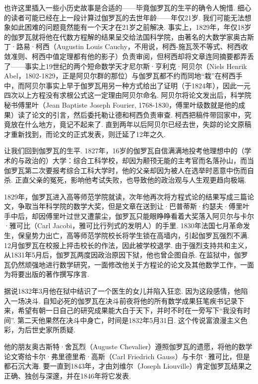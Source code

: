 也许这里插入一些小历史故事是合适的——毕竟伽罗瓦的生平的确令人惋惜. 细心的读者可能已经在上一段计算过伽罗瓦的去世年龄——年仅21岁. 我们可能无法想象如此困难的问题竟然能有一个天才在21岁之前解决. 事实上，1829年，年仅18岁的伽罗瓦就将他在代数方程解的结果呈交给法国科学院，由著名的大数学家奥古斯丁·路易·柯西（Augustin Louis Cauchy，不用说，柯西-施瓦茨不等式、柯西收敛准则、柯西中值定理都有他的影子）负责审阅，但柯西却将文章连同摘要都弄丢了——事实上19世纪的两个短命数学天才尼尔斯·亨利克·阿贝尔（Niels Henrik Abel，1802-1829，正是阿贝尔群的那位）与伽罗瓦都不约而同地``栽''在柯西手中，而阿贝尔事实上早于伽罗瓦用另一种方式给出了证明（于1824年），因此一元四次以上方程没有求根公式这一定理由阿贝尔命名. 阿贝尔将论文发出后，科学院秘书傅里叶（Jean Baptiste Joseph Fourier, 1768-1830，傅里叶级数就是他的成果）读了论文的引言，然后委托勒让德和柯西负责审查. 柯西把稿件带回家中，究竟放在什么地方，竟记不起来了. 直到两年以后阿贝尔已经去世，失踪的论文原稿才重新找到，而论文的正式发表，则迁延了12年之久.

让我们回到伽罗瓦的生平. 1827年，16岁的伽罗瓦自信满满地投考他理想中的（学术的与政治的）大学：综合工科学校，却因为颟顸无能的主考官而名落孙山，而当伽罗瓦第二次要报考综合工科大学时，他的父亲却因为被人在选举时恶意中伤而自杀. 正直父亲的冤死，影响他考试失败，也导致他的政治观与人生观更趋向极端.

1829年，伽罗瓦进入高等师范学院就读，次年他再次将方程式论的结果写成三篇论文，争取当年科学院的数学大奖，但是文章在送到让·巴普蒂斯·约瑟夫·傅里叶手中后，却因傅里叶过世又遭蒙尘，伽罗瓦只能眼睁睁看着大奖落入阿贝尔与卡尔·雅可比（Carl Jacobi，雅可比行列式的发明人）的手里. 1830年法国七月革命发生，保皇势力出亡，高等师范学院校长将学生锁在高墙内，引起伽罗瓦强烈不满. 12月伽罗瓦在校报上抨击校长的作法，因此被学校退学. 由于强烈支持共和主义，从1831年5月后，伽罗瓦两度因政治原因下狱，他也曾企图自杀. 在监狱中，伽罗瓦仍然顽强地进行数学研究，一面修改他关于方程论的论文及其他数学工作，一面为将要出版的著作撰写序言.

据说1832年3月他在狱中结识了一个医生的女儿并陷入狂恋. 因为这段感情，他陷入一场决斗. 自知必死的伽罗瓦在决斗前夜将他的所有数学成果狂笔疾书记录下来，希望有朝一日自己的研究成果能大白于天下，并时不时在一旁写下``我没有时间''. 第二天他果然在决斗中身亡，时间是1832年5月31日. 这个传说富浪漫主义色彩，为后世史家所质疑.

他的朋友奥古斯特·舍瓦烈（Auguste Chevalier）遵照伽罗瓦的遗愿，将他的数学论文寄给卡尔·弗里德里希·高斯（Carl Friedrich Gauss）与卡尔·雅可比，但是都石沉大海. 要一直到1843年，才由刘维尔（Joseph Liouville）肯定伽罗瓦结果之正确、独创与深邃，并在1846年将它发表.

